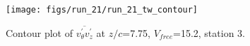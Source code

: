 \begin{figure}[H]
\centering
\texttt{[image: figs/run\_21/run\_21\_tw\_contour]}
\caption{Contour plot of $\overline{v_{\theta}^{\prime} v_{z}^{\prime}}$ at $z/c$=7.75, $V_{free}$=15.2, station 3.}
\label{fig:run_21_tw_contour}
\end{figure}


